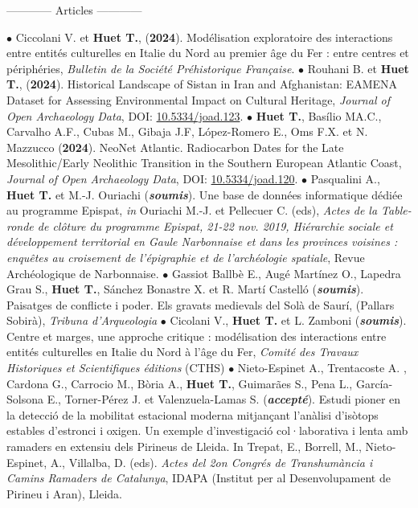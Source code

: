 \documentclass{article}
\begin{document}
\begin{center}------------ Articles ------------\end{center}
$\bullet$ Ciccolani V. et \textbf{Huet T.}, (\textbf{2024}). Modélisation exploratoire des interactions entre entités culturelles en Italie du Nord au premier âge du Fer : entre centres et périphéries, \textit{Bulletin de la Soci\'{e}t\'{e} Pr\'{e}historique Fran\c{c}aise}.
\smallbreak
$\bullet$ Rouhani B. et \textbf{Huet T.}, (\textbf{2024}). Historical Landscape of Sistan in Iran and Afghanistan: EAMENA Dataset for Assessing Environmental Impact on Cultural Heritage, \textit{Journal of Open Archaeology Data}, DOI: \href{https://openarchaeologydata.metajnl.com/articles/10.5334/joad.123}{10.5334/joad.123}.
\smallbreak
$\bullet$ \textbf{Huet T.}, Basílio MA.C., Carvalho A.F., Cubas M., Gibaja J.F, López-Romero E., Oms F.X. et N. Mazzucco (\textbf{2024}). NeoNet Atlantic. Radiocarbon Dates for the Late Mesolithic/Early Neolithic Transition in the Southern European Atlantic Coast, \textit{Journal of Open Archaeology Data}, DOI: \href{https://openarchaeologydata.metajnl.com/articles/10.5334/joad.120}{10.5334/joad.120}.
\smallbreak
$\bullet$ Pasqualini A., \textbf{Huet T.} et M.-J. Ouriachi (\textit{\textbf{soumis}}). Une base de données informatique dédiée au programme Epispat, \textit{in} Ouriachi M.-J. et Pellecuer C. (eds), \textit{Actes de la Table-ronde de cl\^{o}ture du programme Epispat, 21-22 nov. 2019, Hi\'{e}rarchie sociale et d\'{e}veloppement territorial en Gaule Narbonnaise et dans les provinces voisines : enqu\^{e}tes au croisement de l'\'{e}pigraphie et de l'arch\'{e}ologie spatiale}, Revue Arch\'{e}ologique de Narbonnaise.
\smallbreak
$\bullet$ Gassiot Ballbè E., Augé Martínez O., Lapedra Grau S., \textbf{Huet T.}, Sánchez Bonastre X. et R. Martí Castelló (\textit{\textbf{soumis}}). Paisatges de conflicte i poder. Els gravats medievals del Solà de Saurí, (Pallars Sobirà), \textit{Tribuna d'Arqueologia}
\smallbreak
$\bullet$ Cicolani V., \textbf{Huet T.} et L. Zamboni (\textit{\textbf{soumis}}). Centre et marges, une approche critique : modélisation des interactions entre entités culturelles en Italie du Nord à l'âge du Fer, \textit{Comit\'{e} des Travaux Historiques et Scientifiques \'{e}ditions} (CTHS)
\smallbreak
$\bullet$ Nieto-Espinet A., Trentacoste A. , Cardona G., Carrocio M.,  Bòria A., \textbf{Huet T.}, Guimarães S., Pena L., García-Solsona E., Torner-Pérez J. et  Valenzuela-Lamas S. (\textit{\textbf{accepté}}). Estudi pioner en la detecció de la mobilitat estacional moderna mitjançant l'anàlisi d'isòtops estables d'estronci i oxigen. Un exemple d'investigació col·laborativa i lenta amb ramaders en extensiu dels Pirineus de Lleida. In Trepat, E., Borrell, M., Nieto-Espinet, A., Villalba, D. (eds). \textit{Actes del 2on Congrés de Transhumància i Camins Ramaders de Catalunya}, IDAPA (Institut per al Desenvolupament de Pirineu i Aran), Lleida. 
\end{document}
